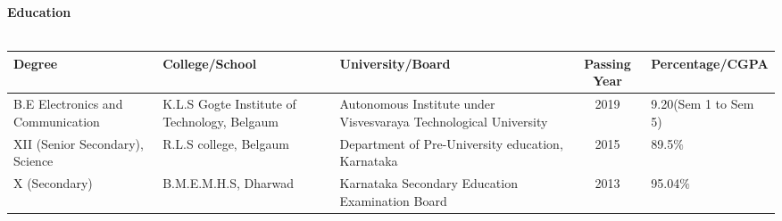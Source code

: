 \documentclass[15pt]{article}
\begin{document}
\vspace{1mm}
\begin{flushleft}
	{\textbf{Education }} \\
	\vspace{0.5mm}
	\noindent \hrulefill 
	\vspace{0.5mm} \\
	\begin{tabular}{|p{3cm}|p{3cm}|p{3cm}|c|p{3cm}|}
		\hline
		Degree & College/School & University/Board & Passing Year & Percentage/CGPA \\
		\hline 
		B.E Electronics and Communication & K.L.S Gogte Institute of Technology, Belgaum & Autonomous Institute under Visvesvaraya Technological University & 2019 & 9.20(Sem 1 to Sem 5) \\
		\hline
		XII (Senior Secondary), Science & R.L.S college, Belgaum & Department of Pre-University education, Karnataka & 2015 & 89.5$\%$ \\
		\hline
		X (Secondary) & B.M.E.M.H.S, Dharwad & Karnataka Secondary Education Examination Board & 2013 & 95.04$\%$ \\
		\hline
	\end{tabular}
\end{flushleft}
\end{document}
